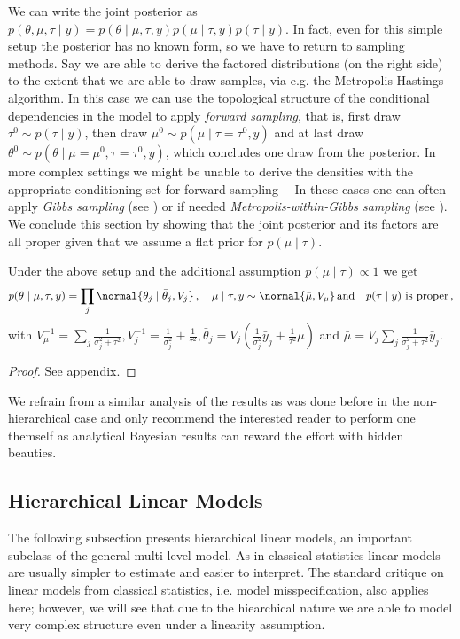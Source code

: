 We can write the joint posterior as $p(\theta, \mu, \tau \mid y) = p(\theta \mid \mu, \tau, y) p(\mu \mid \tau, y) p(\tau \mid y)$.
In fact, even for this simple setup the posterior has no known form, so we have to return to sampling methods.
Say we are able to derive the factored distributions (on the right side) to the extent that we are able to draw samples, via e.g. the Metropolis-Hastings algorithm.
In this case we can use the topological structure of the conditional dependencies in the model to apply \emph{forward sampling}, that is, first draw $\tau^0 \sim p(\tau \mid y)$, then draw $\mu^0 \sim p(\mu \mid \tau=\tau^0, y)$ and at last draw $\theta^0 \sim p(\theta \mid \mu=\mu^0, \tau=\tau^0, y)$, which concludes one draw from the posterior.
In more complex settings we might be unable to derive the densities with the appropriate conditioning set for forward sampling ---In these cases one can often apply \emph{Gibbs sampling} (see \citet{geman1984}) or if needed \emph{Metropolis-within-Gibbs sampling} (see \citet{gilks1995}).
We conclude this section by showing that the joint posterior and its factors are all proper given that we assume a flat prior for $p(\mu \mid \tau)$.

\begin{proposition}\label{prop:hierarchical_posterior}
    Under the above setup and the additional assumption $p(\mu \mid \tau) \propto 1$ we get
    \begin{align}
      p(\theta \mid \mu, \tau, y) =  \prod_j \normal{\theta_j \mid \bar{\theta}_j, V_j} \,,  \quad
      \mu \mid \tau, y \sim \normal{\bar{\mu}, V_\mu}\,\text{and} \quad
      p(\tau \mid y) \,\, \text{is proper} \,,
    \end{align}
    with $V_\mu^{-1} = \sum_j \frac{1}{\sigma_j^2 + \tau^2}, V_j^{-1}=\frac{1}{\sigma_j^2} + \frac{1}{\tau^2}, \bar{\theta}_j=V_j(\frac{1}{\sigma_j^2} \bar{y}_j + \frac{1}{\tau^2}\mu)$ and $\bar{\mu} = V_j \sum_j \frac{1}{\sigma_j^2 + \tau^2} \bar{y}_j$.
\end{proposition}
\begin{proof}
See appendix.
\end{proof}

We refrain from a similar analysis of the results as was done before in the non-hierarchical case and only recommend the interested reader to perform one themself as analytical Bayesian results can reward the effort with hidden beauties.

\subsection{Hierarchical Linear Models}
The following subsection presents hierarchical linear models, an important subclass of the general multi-level model.
As in classical statistics linear models are usually simpler to estimate and easier to interpret.
The standard critique on linear models from classical statistics, i.e. model misspecification, also applies here; however, we will see that due to the hiearchical nature we are able to model very complex structure even under a linearity assumption.

